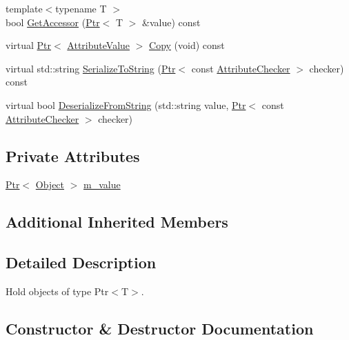 \begin{DoxyCompactItemize}
\item 
{\footnotesize template$<$typename T $>$ }\\bool \hyperlink{classns3_1_1PointerValue_ae49b4da3842a854f212fdd82dd255425}{Get\+Accessor} (\hyperlink{classns3_1_1Ptr}{Ptr}$<$ T $>$ \&value) const 
\item 
virtual \hyperlink{classns3_1_1Ptr}{Ptr}$<$ \hyperlink{classns3_1_1AttributeValue}{Attribute\+Value} $>$ \hyperlink{classns3_1_1PointerValue_a914dea63cae25faf56c1000c60283ef6}{Copy} (void) const 
\item 
virtual std\+::string \hyperlink{classns3_1_1PointerValue_a1b2cca223a38e146dff8299a3ca157c9}{Serialize\+To\+String} (\hyperlink{classns3_1_1Ptr}{Ptr}$<$ const \hyperlink{classns3_1_1AttributeChecker}{Attribute\+Checker} $>$ checker) const 
\item 
virtual bool \hyperlink{classns3_1_1PointerValue_ab5fb344a04892f22549d42c17cc1856d}{Deserialize\+From\+String} (std\+::string value, \hyperlink{classns3_1_1Ptr}{Ptr}$<$ const \hyperlink{classns3_1_1AttributeChecker}{Attribute\+Checker} $>$ checker)
\end{DoxyCompactItemize}
\subsection*{Private Attributes}
\begin{DoxyCompactItemize}
\item 
\hyperlink{classns3_1_1Ptr}{Ptr}$<$ \hyperlink{classns3_1_1Object}{Object} $>$ \hyperlink{classns3_1_1PointerValue_a778b6cab28caa88736638ae99c528197}{m\+\_\+value}
\end{DoxyCompactItemize}
\subsection*{Additional Inherited Members}


\subsection{Detailed Description}
Hold objects of type Ptr$<$\+T$>$. 

\subsection{Constructor \& Destructor Documentation}

